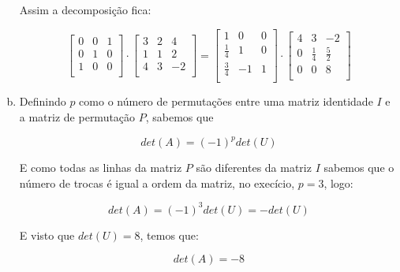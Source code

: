 \documentclass[11pt]{article}
\begin{document}
\begin{exerc}
\begin{enumerate}[a.]
Assim a decomposição fica:

$$
\begin{bmatrix}
	0 & 0 & 1\\
	0 & 1 & 0\\
	1 & 0 & 0\\
\end{bmatrix}
\cdot
\begin{bmatrix}
	3 & 2 & 4\\
	1 & 1 & 2\\
	4 & 3 & -2\\
\end{bmatrix}
=
\begin{bmatrix}
	1 & 0 & 0\\
	\frac{1}{4} & 1 & 0\\
	\frac{3}{4} & -1 & 1\\
\end{bmatrix}
\cdot
\begin{bmatrix}
	4 & 3 & -2\\
	0 & \frac{1}{4} & \frac{5}{2}\\
	0 & 0 & 8\\
\end{bmatrix}
$$
\newpage
\item
Definindo $p$ como o número de permutações entre uma matriz identidade $I$ e a matriz de permutação $P$, sabemos que

$$det(A) = (-1)^p det(U)$$

E como todas as linhas da matriz $P$ são diferentes da matriz $I$ sabemos que o número de trocas é igual a ordem da matriz, no execício, $p = 3$, logo:

$$det(A) = (-1)^3 det(U) = -det(U)$$

E visto que $det(U) = 8$, temos que:

$$det(A) = -8$$

\end{enumerate}
\end{exerc}
\end{document}

